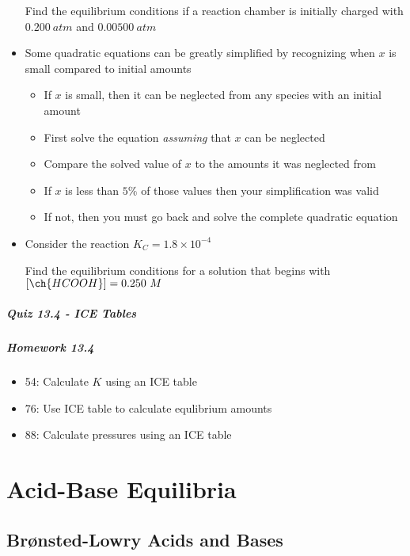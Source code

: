 \documentclass[12pt, openany, letterpaper]{memoir}
\begin{document}
\begin{itemize}
	Find the equilibrium conditions if a reaction chamber is initially charged with $0.200~atm$  and $0.00500~atm$ 
	\item Some quadratic equations can be greatly simplified by recognizing when $x$ is small compared to initial amounts
	\begin{itemize}
		\item If $x$ is small, then it can be neglected from any species with an initial amount
		\item First solve the equation \emph{assuming} that $x$ can be neglected
		\item Compare the solved value of $x$ to the amounts it was neglected from
		\item If $x$ is less than $5\%$ of those values then your simplification was valid
		\item If not, then you must go back and solve the complete quadratic equation
	\end{itemize}
	\item Consider the reaction  \hspace{1em} $K_C=1.8\times10^{-4}$
	
	Find the equilibrium conditions for a solution that begins with $\left[\ch{HCOOH}\right]=0.250~M$
\end{itemize}

\paragraph*{Quiz 13.4 - ICE Tables}
\paragraph*{Homework 13.4}
\begin{itemize}
  \item 54: Calculate $K$ using an ICE table
  \item 76: Use ICE table to calculate equlibrium amounts
  \item 88: Calculate pressures using an ICE table
\end{itemize}

\chapter{Acid-Base Equilibria}

\section{Brønsted-Lowry Acids and Bases}
\end{document}
